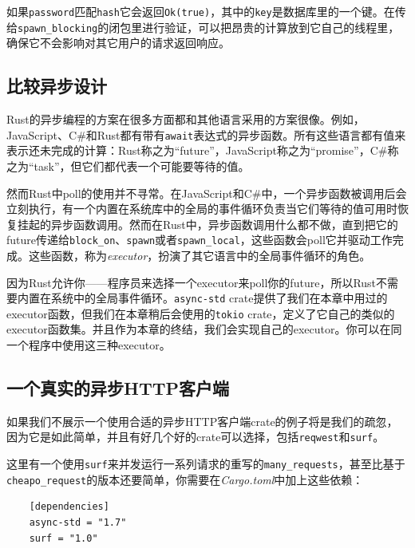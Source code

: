 如果\texttt{password}匹配\texttt{hash}它会返回\texttt{Ok(true)}，其中的\texttt{key}是数据库里的一个键。在传给\texttt{spawn\_blocking}的闭包里进行验证，可以把昂贵的计算放到它自己的线程里，确保它不会影响对其它用户的请求返回响应。

\subsection{比较异步设计}
Rust的异步编程的方案在很多方面都和其他语言采用的方案很像。例如，JavaScript、C\#和Rust都有带有\texttt{await}表达式的异步函数。所有这些语言都有值来表示还未完成的计算：Rust称之为“future”，JavaScript称之为“promise”，C\#称之为“task”，但它们都代表一个可能要等待的值。

然而Rust中poll的使用并不寻常。在JavaScript和C\#中，一个异步函数被调用后会立刻执行，有一个内置在系统库中的全局的事件循环负责当它们等待的值可用时恢复挂起的异步函数调用。然而在Rust中，异步函数调用什么都不做，直到把它的future传递给\texttt{block\_on}、\texttt{spawn}或者\texttt{spawn\_local}，这些函数会poll它并驱动工作完成。这些函数，称为\emph{executor}，扮演了其它语言中的全局事件循环的角色。

因为Rust允许你——程序员来选择一个executor来poll你的future，所以Rust不需要内置在系统中的全局事件循环。\texttt{async-std} crate提供了我们在本章中用过的executor函数，但我们在本章稍后会使用的\texttt{tokio} crate，定义了它自己的类似的executor函数集。并且作为本章的终结，我们会实现自己的executor。你可以在同一个程序中使用这三种executor。

\subsection{一个真实的异步HTTP客户端}
如果我们不展示一个使用合适的异步HTTP客户端crate的例子将是我们的疏忽，因为它是如此简单，并且有好几个好的crate可以选择，包括\texttt{reqwest}和\texttt{surf}。

这里有一个使用\texttt{surf}来并发运行一系列请求的重写的\texttt{many\_requests}，甚至比基于\texttt{cheapo\_request}的版本还要简单，你需要在\emph{Cargo.toml}中加上这些依赖：
\begin{verbatim}
    [dependencies]
    async-std = "1.7"
    surf = "1.0"
\end{verbatim}

